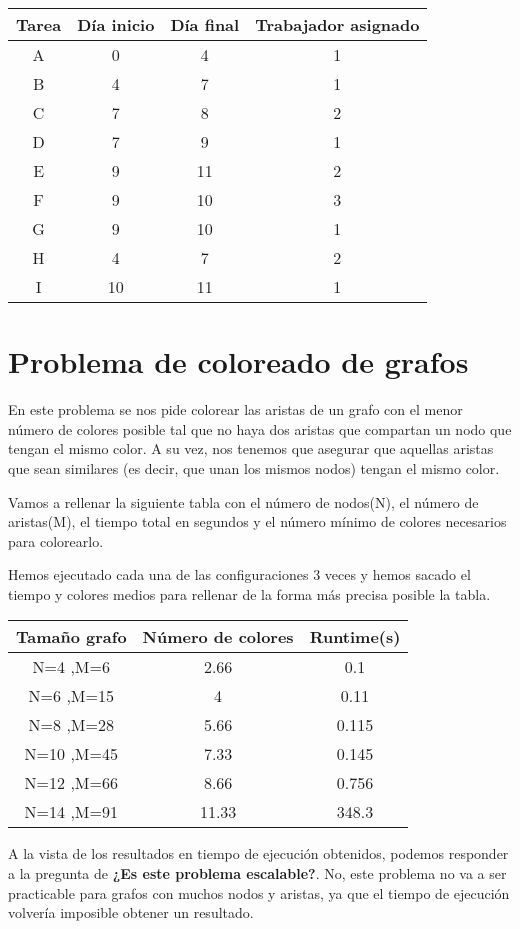 \begin{center}
\begin{tabular}{|c|c|c|c|}
    \hline
    Tarea & Día inicio & Día final & Trabajador asignado\\
    \hline A & 0 & 4 & 1\\
     B & 4 & 7 & 1\\
     C & 7 & 8 & 2\\
     D & 7 & 9 & 1\\
     E & 9 & 11 & 2\\
     F & 9 & 10 & 3\\
     G & 9 & 10 & 1\\
     H & 4 & 7 & 2\\
     I & 10 & 11 & 1\\
    \hline
\end{tabular}
\end{center}

\newpage

\section{Problema de coloreado de grafos}

En este problema se nos pide colorear las aristas de un grafo con el menor número de colores posible tal que no haya dos aristas que compartan un nodo que tengan el mismo color.
A su vez, nos tenemos que asegurar que aquellas aristas que sean similares (es decir, que unan los mismos nodos) tengan el mismo color.

Vamos a rellenar la siguiente tabla con el número de nodos(N), el número de aristas(M), el tiempo total en segundos y el número mínimo de colores necesarios para colorearlo.

Hemos ejecutado cada una de las configuraciones 3 veces y hemos sacado el tiempo y colores medios para rellenar de la forma más precisa posible la tabla.

\begin{center}
\begin{tabular}{|c|c|c|}
    \hline
    Tamaño grafo & Número de colores & Runtime(s) \\
    \hline 
     N=4 ,M=6 & 2.66 & 0.1\\
     N=6 ,M=15 & 4 & 0.11\\
     N=8 ,M=28 & 5.66 & 0.115\\
     N=10 ,M=45 & 7.33 & 0.145\\
     N=12 ,M=66 & 8.66 & 0.756\\
     N=14 ,M=91 & 11.33 & 348.3\\
     \hline
\end{tabular}
\end{center}

A la vista de los resultados en tiempo de ejecución obtenidos, podemos responder a la pregunta de \textbf{¿Es este problema escalable?}.
No, este problema no va a ser practicable para grafos con muchos nodos y aristas, ya que el tiempo de ejecución volvería imposible obtener un resultado.


